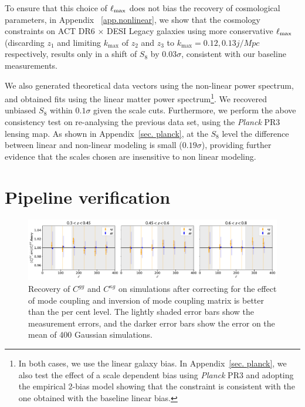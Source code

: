 \documentclass[twocolumn]{aastex631}
\begin{document}
{To ensure that this choice of $\ell_{\rm max}$ does not bias the recovery of cosmological parameters, in Appendix ~\ref{app.nonlinear}, we show that the cosmology constraints on ACT DR6 $\times$ DESI Legacy galaxies using more conservative $\ell_{\rm max}$ (discarding $z_1$ and limiting $k_\mathrm{max}$  of $z_2$ and $z_3$ to $k_\mathrm{max}=0.12,0.13j/Mpc$ respectively, results only in a shift of $S_8$ by $0.03\sigma$, consistent with our baseline measurements.

We also generated theoretical data vectors using the non-linear power spectrum, and obtained fits using the linear matter power spectrum\footnote{In both cases, we use the linear galaxy bias. In Appendix~\ref{sec. planck}, we also test the effect of a scale dependent bias using \textit{Planck} PR3 and adopting the empirical 2-bias model showing that the constraint is consistent with the one obtained with the baseline linear bias.}. We recovered unbiased $S_8$ within $0.1\sigma$ given the scale cuts.   Furthermore, we  perform the above consistency test on re-analysing the previous data set, using the {\it Planck} PR3 lensing map. As shown in Appendix~\ref{sec. planck}, at the $S_8$ level the difference between linear and non-linear modeling is small ($0.19\sigma$), providing further evidence that the scales chosen are insensitive to non linear modeling.










\section{Pipeline verification}\label{sec. pipeline_verification}

\begin{figure}
    \centering
    \includegraphics[width=\linewidth]{figures/verification.pdf}
    \caption{Recovery of $C^{gg}$ and  $C^{\kappa{g}}$ on simulations after correcting for the effect of mode coupling and inversion of mode coupling matrix is better than the per cent level. The lightly shaded error bars show the measurement errors, and the darker error bars show the error on the mean of 400 Gaussian simulations.}
    \label{fig:verification}
\end{figure}

}
\end{document}
